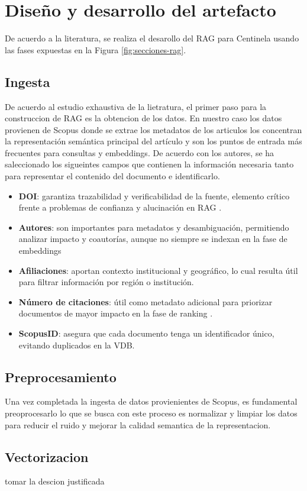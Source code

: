 \section{Diseño y desarrollo del artefacto}
De acuerdo a la literatura, se realiza el desarollo del RAG para Centinela usando las fases expuestas en la Figura \ref{fig:secciones-rag}. 

\subsection{Ingesta} 
De acuerdo al estudio exhaustiva de la lietratura, el primer paso para la construccion de RAG es la obtencion de los datos. En nuestro caso
los datos provienen de Scopus donde se extrae los metadatos de los articulos los concentran la representación semántica principal del artículo y son los puntos 
de entrada más frecuentes para consultas y embeddings\parencite{zhai2024llmIR}. De acuerdo con los autores, se ha saleccionado los sigueintes campos que 
contienen la información necesaria tanto para representar el contenido del documento e identificarlo.

\begin{itemize}
    \item \textbf{DOI}: garantiza trazabilidad y verificabilidad de la fuente, elemento crítico frente a problemas de confianza y alucinación en RAG \parencite{knollmeyer2024benchmarking}.
    \item \textbf{Autores}: son importantes para metadatos y desambiguación, permitiendo analizar impacto y coautorías, aunque no siempre se indexan en la fase de embeddings \parencite{fan2021pretraining}
    \item \textbf{Afiliaciones}: aportan contexto institucional y geográfico, lo cual resulta útil para filtrar información por región o institución.\parencite{ibrihich2022review}
    \item \textbf{Número de citaciones}: útil como metadato adicional para priorizar documentos de mayor impacto en la fase de ranking \parencite{bernard2025fate}.
    \item \textbf{ScopusID}: asegura que cada documento tenga un identificador único, evitando duplicados en la VDB. \parencite{ma2025vector}
\end{itemize}




\subsection{Preprocesamiento}
Una vez completada la ingesta de datos provienientes de Scopus, es fundamental preoprocesarlo lo que se busca con este proceso es normalizar y limpiar los datos 
para reducir el ruido y mejorar la calidad semantica de la representacion.



\subsection{Vectorizacion}
tomar la descion justificada
